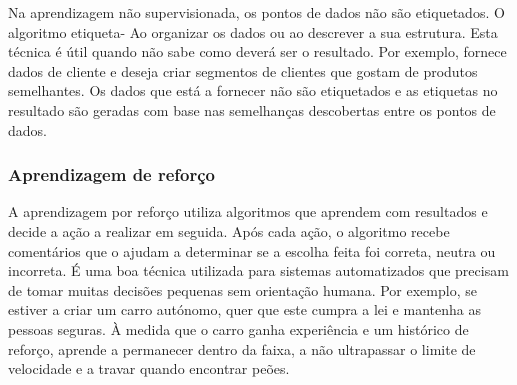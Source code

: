 \documentclass[a4paper,10pt]{article}
\begin{document}
Na aprendizagem não supervisionada, os pontos de dados não são etiquetados.
O algoritmo etiqueta- Ao organizar os dados ou ao descrever a sua estrutura.
Esta técnica é útil quando não sabe como deverá ser o resultado.
Por exemplo, fornece dados de cliente e deseja criar segmentos de clientes que gostam de produtos semelhantes.
Os dados que está a fornecer não são etiquetados e as etiquetas no resultado são geradas com base nas semelhanças descobertas entre os pontos de dados.

\subsubsection{Aprendizagem de reforço}

A aprendizagem por reforço utiliza algoritmos que aprendem com resultados e decide a ação a realizar em seguida.
Após cada ação, o algoritmo recebe comentários que o ajudam a determinar se a escolha feita foi correta, neutra ou incorreta.
É uma boa técnica utilizada para sistemas automatizados que precisam de tomar muitas decisões pequenas sem orientação humana.
Por exemplo, se estiver a criar um carro autónomo, quer que este cumpra a lei e mantenha as pessoas seguras.
À medida que o carro ganha experiência e um histórico de reforço, aprende a permanecer dentro da faixa, a não ultrapassar o limite de velocidade e a travar quando encontrar peões.
\end{document}
